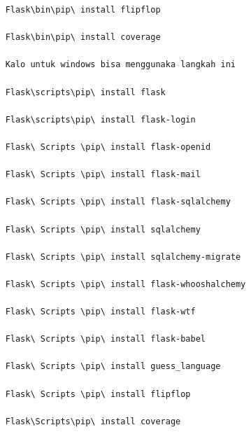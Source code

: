 {{{{\begin{verbatim}
	Flask\bin\pip\ install flipflop
	
	Flask\bin\pip\ install coverage
	
	Kalo untuk windows bisa menggunaka langkah ini
	
	Flask\scripts\pip\ install flask
	
	Flask\scripts\pip\ install flask-login
	
	Flask\ Scripts \pip\ install flask-openid
	
	Flask\ Scripts \pip\ install flask-mail
	
	Flask\ Scripts \pip\ install flask-sqlalchemy
	
	Flask\ Scripts \pip\ install sqlalchemy
	
	Flask\ Scripts \pip\ install sqlalchemy-migrate
	
	Flask\ Scripts \pip\ install flask-whooshalchemy
	
	Flask\ Scripts \pip\ install flask-wtf
	
	Flask\ Scripts \pip\ install flask-babel
	
	Flask\ Scripts \pip\ install guess_language
	
	Flask\ Scripts \pip\ install flipflop
	
	Flask\Scripts\pip\ install coverage
	
\end{verbatim}

}}}}
